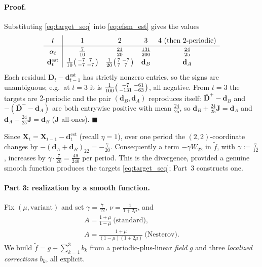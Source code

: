 \paragraph{Proof.}
Substituting \eqref{eq:target_seq} into \eqref{eq:efsm_est} gives the values
\begin{equation}\label{eq:efsm_table}
\renewcommand{\arraystretch}{1.25}
\begin{array}{c|cccc}
t & 1 & 2 & 3 & 4\ (\text{then }2\text{-periodic})\\\hline
\alpha_t & \tfrac7{10} & \tfrac{21}{20} & \tfrac{131}{200} & \tfrac{24}{25}\\
\mathbf d_t^{\mathrm{est}} & \tfrac1{10}\smat{-7}{7}{-7}{-7}
 & \tfrac1{20}\smat{7}{-7}{7}{7} & \mathbf d_B & \mathbf d_A
\end{array}
\end{equation}
Each residual $\mathbf D_t-\mathbf d_{t-1}^{\mathrm{est}}$ has strictly nonzero
entries, so the signs are unambiguous; e.g.\ at $t=3$ it is
$\tfrac1{100}\bigl(\begin{smallmatrix}-7&-61\\-131&-63\end{smallmatrix}\bigr)$, all negative. From $t=3$ the targets
are $2$-periodic and the pair $(\mathbf d_B,\mathbf d_A)$ reproduces itself:
$\bar{\mathbf D}^{+}-\mathbf d_B$ and $-(\bar{\mathbf D}^{-}-\mathbf d_A)$ are
both entrywise positive with mean $\tfrac{24}{25}$, so
$\mathbf d_B+\tfrac{24}{25}\mathbf J=\mathbf d_A$ and
$\mathbf d_A-\tfrac{24}{25}\mathbf J=\mathbf d_B$ ($\mathbf J$ all-ones). $\blacksquare$

\medskip\noindent
Since $\mathbf X_t=\mathbf X_{t-1}-\mathbf d_t^{\mathrm{est}}$ (recall
$\eta=1$), over one period the $(2,2)$-coordinate changes by
$-(\mathbf d_A+\mathbf d_B)_{22}=-\tfrac7{20}$. Consequently a term $-\gamma
W_{22}$ in $\tilde f$, with $\gamma:=\tfrac7{12}$, increases by
$\gamma\cdot\tfrac7{20}=\tfrac{49}{240}$ per period. This is the divergence,
provided a genuine smooth function produces the targets \eqref{eq:target_seq};
Part~3 constructs one.

\paragraph{Part 3: realization by a smooth function.}
Fix $(\mu,\text{variant})$ and set $\gamma=\tfrac7{12}$, $\nu=\tfrac1{1+2\mu}$,
and
\begin{equation}\label{eq:Amu}
\begin{gathered}
A=\frac{1+\mu}{1-\mu}\ \text{(standard)},\\
A=\frac{1+\mu}{(1-\mu)(1+2\mu)}\ \text{(Nesterov)}.
\end{gathered}
\end{equation}
We build $\tilde f=g+\sum_{k=1}^{3}b_k$ from a periodic-plus-linear
\emph{field} $g$ and three \emph{localized corrections} $b_k$, all explicit.

